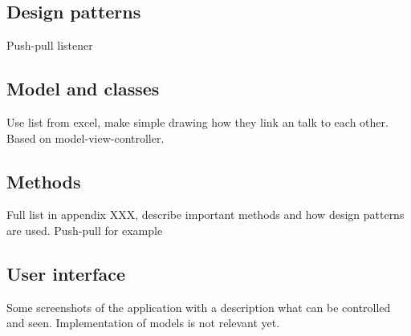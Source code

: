 \subsection{Design patterns}
Push-pull listener

\subsection{Model and classes}
Use list from excel, make simple drawing how they link an talk to each other. Based on model-view-controller.

\subsection{Methods}
Full list in appendix XXX, describe important methods and how design patterns are used. Push-pull for example

\subsection{User interface}
Some screenshots of the application with a description what can be controlled and seen. Implementation of models is not relevant yet.